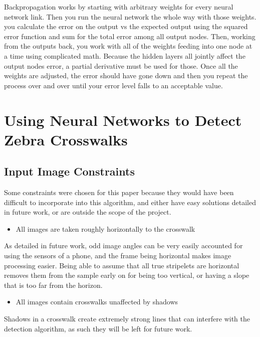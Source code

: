 \documentclass[12pt]{ucthesis}
\begin{document}
Backpropagation works by starting with arbitrary weights for every neural network link. Then you run the neural network the whole way with those weights. you calculate the error on the output vs the expected output using the squared error function and sum for the total error among all output nodes. Then, working from the outputs back, you work with all of the weights feeding into one node at a time using complicated math. Because the hidden layers all jointly affect the output nodes error, a partial derivative must be used for those. Once all the weights are adjusted, the error should have gone down and then you repeat the process over and over until your error level falls to an acceptable value. 

\chapter{Using Neural Networks to Detect Zebra Crosswalks}

\section{Input Image Constraints}
\label{Input Image Constraints}

Some constraints were chosen for this paper because they would have been difficult to incorporate into this algorithm, and either have easy solutions detailed in future work, or are outside the scope of the project. 

\begin{itemize}
\item All images are taken roughly horizontally to the crosswalk
\end{itemize}

As detailed in future work, odd image angles can be very easily accounted for using the sensors of a phone, and the frame being horizontal makes image processing easier. Being able to assume that all true stripelets are horizontal removes them from the sample early on for being too vertical, or having a slope that is too far from the horizon. 

\begin{itemize}
\item All images contain crosswalks unaffected by shadows
\end{itemize}

Shadows in a crosswalk create extremely strong lines that can interfere with the detection algorithm, as such they will be left for future work. 
\end{document}
